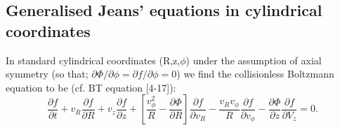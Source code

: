 \subsection{Generalised Jeans' equations in cylindrical coordinates} \label{sec:jeans_rederivation}
In standard cylindrical coordinates (R,z,$\phi$) under the assumption of axial symmetry (so that; $\partial \Phi / \partial \phi = \partial f / \partial \phi = 0$) we find the collisionless Boltzmann equation to be (cf. BT equation [4-17]): 
\begin{equation} \label{eq:CBE}
\frac{\partial f}{\partial t} + v_R \frac{\partial f}{\partial R} + v_z \frac{\partial f}{\partial z} + \left[\frac{v_{\phi}^2}{R} - \frac{\partial \Phi}{\partial R}\right] \frac{\partial f}{\partial v_R} - \frac{v_R v_{\phi}}{R} \frac{\partial f}{\partial v_{\phi}} - \frac{\partial \Phi}{\partial z} \frac{\partial f}{\partial V_z} = 0.
\end{equation}

